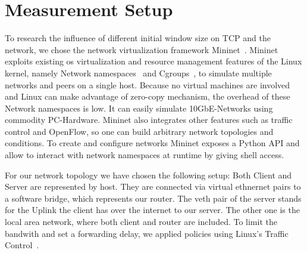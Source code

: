\section{Measurement Setup}
\label{sec:measurement_setup}

To research the influence of different initial window size on TCP and the
network, we chose the network virtualization framework Mininet~\cite{mininet}.
Mininet exploits existing os virtualization and resource management features of
the Linux kernel, namely Network namespaces~\cite{network_namespaces} and
Cgroups~\cite{cgroups}, to simulate multiple networks and peers on a single
host. Because no virtual machines are involved and Linux can make advantage of
zero-copy mechanism, the overhead of these Network namespaces is low. It can
easily simulate 10GbE-Networks using commodity PC-Hardware. Mininet also
integrates other features such as traffic control and OpenFlow, so one can build
arbitrary network topologies and conditions. To create and configure networks
Mininet exposes a Python API and allow to interact with network namespaces at
runtime by giving shell access.



For our network topology we have chosen the following setup: Both Client and
Server are represented by host. They are connected via virtual ethnernet pairs
to a software bridge, which represents our router. The veth pair of the server
stands for the Uplink the client has over the internet to our server. The other
one is the local area network, where both client and router are included.
To limit the bandwith and set a forwarding delay, we applied policies using
Linux's Traffic Control~\cite{tc}.

%
%
%
%
%
